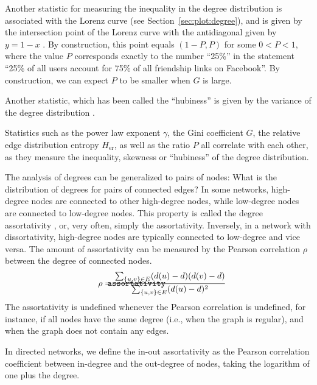 \documentclass{article}
\def\mathnote#1{%
  \tag*{\rlap{\hspace\marginparsep\smash{\parbox[t]{\marginparwidth}{#1}}}}
}
\begin{document}
Another statistic for  measuring the inequality
in the degree distribution is associated with the Lorenz curve (see
Section~\ref{sec:plot:degree}), and is given by the intersection point
of the Lorenz curve with the antidiagonal given by $y = 1 - x$
\citep{kunegis:power-law}.  By construction, this point equals $(1-P, P)$
for some $0<P<1$, where the value $P$ corresponds exactly to the number
``25\%'' in the statement ``25\% of all users account for 75\% of all
friendship links on Facebook''.  By construction, we can expect $P$ to
be smaller when $G$ is large.

Another statistic, which has been called the ``hubiness'' is given by
the variance of the degree distribution \cite[e.g. by][]{b883,b884}.

Statistics such as the power law exponent $\gamma$, the Gini coefficient
$G$, the relative edge distribution entropy $H_{\mathrm{er}}$, as well
as the ratio $P$ all correlate with each other, as they measure the
inequality, skewness or ``hubiness'' of the degree distribution. 

The analysis of degrees can be generalized to pairs of nodes:  What is
the distribution of degrees for pairs of connected edges?  In some
networks, high-degree nodes are connected to other high-degree nodes,
while low-degree nodes are connected to low-degree nodes.  This property
is called the degree assortativity \citep{b854}, or, very often, simply the
assortativity.  Inversely, in a network with dissortativity,  
high-degree nodes are typically connected to low-degree and vice versa.
The amount of assortativity can be measured by the Pearson correlation
$\rho$ between the degree of connected nodes.  
\begin{align}
  \mathnote{\texttt{assortativity}} 
  \rho &= \frac
  {\sum_{\{u,v\} \in E} (d(u) - d)(d(v) - d)}
  {\sum_{\{u,v\} \in E} (d(u) - d)^2}
\end{align}
The assortativity is
undefined whenever the Pearson correlation is undefined, for instance,
if all nodes have the same degree (i.e., when the graph is regular), and
when the graph does not contain any edges. 

In directed networks, we define the in-out assortativity as the Pearson
correlation coefficient between in-degree and the out-degree of nodes,
taking the logarithm of one plus the degree.
\end{document}
